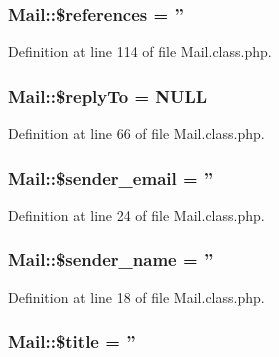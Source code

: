 \hypertarget{classMail_abcd438320caac44b166df90ba9092fe9}{
\subsubsection[{\$references}]{\setlength{\rightskip}{0pt plus 5cm}Mail\-::\$references = ''}}\label{classMail_abcd438320caac44b166df90ba9092fe9}


Definition at line 114 of file Mail.\-class.\-php.

\hypertarget{classMail_a55788852017ccc1716af69cdde26df99}{
\subsubsection[{\$reply\-To}]{\setlength{\rightskip}{0pt plus 5cm}Mail\-::\$reply\-To = N\-U\-L\-L}}\label{classMail_a55788852017ccc1716af69cdde26df99}


Definition at line 66 of file Mail.\-class.\-php.

\hypertarget{classMail_a94dccbbdc161e818d90e41ad197ebe85}{
\subsubsection[{\$sender\-\_\-email}]{\setlength{\rightskip}{0pt plus 5cm}Mail\-::\$sender\-\_\-email = ''}}\label{classMail_a94dccbbdc161e818d90e41ad197ebe85}


Definition at line 24 of file Mail.\-class.\-php.

\hypertarget{classMail_a0ad6aa18dc8ea8c632bb7a82175e8d68}{
\subsubsection[{\$sender\-\_\-name}]{\setlength{\rightskip}{0pt plus 5cm}Mail\-::\$sender\-\_\-name = ''}}\label{classMail_a0ad6aa18dc8ea8c632bb7a82175e8d68}


Definition at line 18 of file Mail.\-class.\-php.

\hypertarget{classMail_aea1a8697c961d49a688564c5ca16cbcb}{
\subsubsection[{\$title}]{\setlength{\rightskip}{0pt plus 5cm}Mail\-::\$title = ''}}\label{classMail_aea1a8697c961d49a688564c5ca16cbcb}



